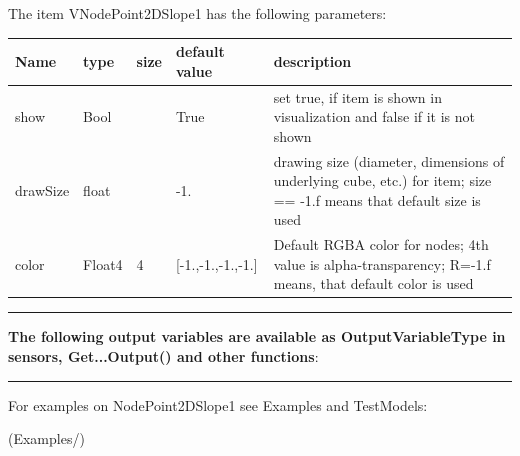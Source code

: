 The item VNodePoint2DSlope1 has the following parameters:\vspace{-1cm}\\ 
\begin{center}
  \footnotesize
  \begin{longtable}{| p{4.5cm} | p{2.5cm} | p{0.5cm} | p{2.5cm} | p{6cm} |}
    \hline
    \bf Name & \bf type & \bf size & \bf default value & \bf description \\ \hline
    show &     Bool &      &     True &     set true, if item is shown in visualization and false if it is not shown\\ \hline
    drawSize &     float &      &     -1. &     drawing size (diameter, dimensions of underlying cube, etc.)  for item; size == -1.f means that default size is used\\ \hline
    color &     Float4 &     4 &     [-1.,-1.,-1.,-1.] &     Default RGBA color for nodes; 4th value is alpha-transparency; R=-1.f means, that default color is used\\ \hline
	  \end{longtable}
	\end{center}
\par\noindent\rule{\textwidth}{0.4pt}
\label{description_NodePoint2DSlope1}
{\bf The following output variables are available as OutputVariableType in sensors, Get...Output() and other functions}: 
\finishTable
\vspace{6pt}\par\noindent\rule{\textwidth}{0.4pt}
%
\noindent For examples on NodePoint2DSlope1 see Examples and TestModels:
\bi
\item {} (Examples/)
